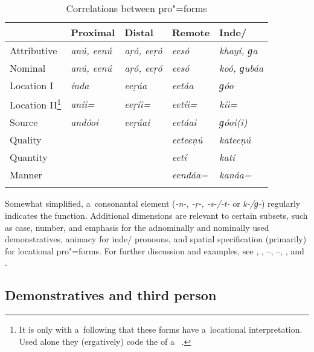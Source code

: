 \begin{table}[ht]
\caption{Correlations between pro"=forms}
\begin{tabularx}{\textwidth}{ Q Q Q Q Q }
\lsptoprule
&
Proximal
&
Distal
&
Remote
&
Inde/{\allowbreak}\\\midrule
Attributive &
\textit{anú, eenú} &
\textit{aṛó, eeṛó} &
\textit{eesó} &
\textit{khayí, ɡa} \\
Nominal &
\textit{anú, eenú} &
\textit{aṛó, eeṛó} &
\textit{eesó} &
\textit{koó, ɡubáa} \\
Location I &
\textit{índa} &
\textit{eeṛáa} &
\textit{eetáa} &
\textit{ɡóo} \\
Location II\footnote{It is only with a~following  that these forms have a~locational interpretation. Used alone they (ergatively) code the  of a~  .} &
\textit{aníi=} &
\textit{eeṛíi=} &
\textit{eetíi=} &
\textit{kíi=} \\
Source &
\textit{andóoi} &
\textit{eeṛáai} &
\textit{eetáai} &
\textit{ɡóoi(i)} \\
Quality &
&
&
\textit{eeteeṇú} &
\textit{kateeṇú} \\
Quantity &
&
&
\textit{eetí} &
\textit{katí} \\
Manner &
&
&
\textit{eendáa=} &
\textit{kanáa=} \\\lspbottomrule
\end{tabularx}
\label{tab:5-2}
\end{table}

Somewhat simplified, a~consonantal element (\textit{-n-, -ṛ-, -s-/-t-} or \textit{k-/ɡ-}) regularly indicates the  function. Additional dimensions are relevant to certain subsets, such as case, number,  and emphasis for the adnominally and nominally used demonstratives, animacy for inde/ pronouns, and spatial specification (primarily) for locational pro"=forms. For further discussion and examples, see , , --, --, ,  and .

\subsection{Demonstratives and third person}
\label{subsec:5-2-2}


